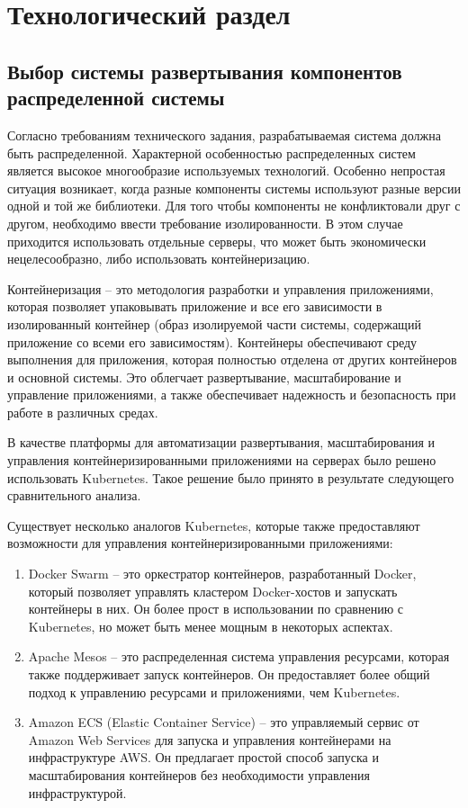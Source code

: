 \chapter{Технологический раздел}

\section{Выбор системы развертывания компонентов распределенной системы}


Согласно требованиям технического задания, разрабатываемая система должна быть распределенной. Характерной особенностью распределенных систем является высокое многообразие используемых технологий. Особенно непростая ситуация возникает, когда разные компоненты системы используют разные версии одной и той же библиотеки. Для того чтобы компоненты не конфликтовали друг с другом, необходимо ввести требование изолированности. В этом случае приходится использовать отдельные серверы, что может быть экономически нецелесообразно, либо использовать контейнеризацию. 

Контейнеризация -- это методология разработки и управления приложениями, которая позволяет упаковывать приложение и все его зависимости в изолированный контейнер (образ изолируемой части системы, содержащий приложение со всеми его зависимостям). Контейнеры обеспечивают среду выполнения для приложения, которая полностью отделена от других контейнеров и основной системы. Это облегчает развертывание, масштабирование и управление приложениями, а также обеспечивает надежность и безопасность при работе в различных средах. 

В качестве платформы для автоматизации развертывания, масштабирования и управления контейнеризированными приложениями на серверах было решено использовать Kubernetes. Такое решение было принято в результате следующего сравнительного анализа.

Существует несколько аналогов Kubernetes, которые также предоставляют возможности для управления контейнеризированными приложениями:
\begin{enumerate}
    \item Docker Swarm -- это оркестратор контейнеров, разработанный Docker, который позволяет управлять кластером Docker-хостов и запускать контейнеры в них. Он более прост в использовании по сравнению с Kubernetes, но может быть менее мощным в некоторых аспектах.
    \item Apache Mesos -- это распределенная система управления ресурсами, которая также поддерживает запуск контейнеров. Он предоставляет более общий подход к управлению ресурсами и приложениями, чем Kubernetes.
    \item Amazon ECS (Elastic Container Service) -- это управляемый сервис от Amazon Web Services для запуска и управления контейнерами на инфраструктуре AWS. Он предлагает простой способ запуска и масштабирования контейнеров без необходимости управления инфраструктурой.
\end{enumerate}

